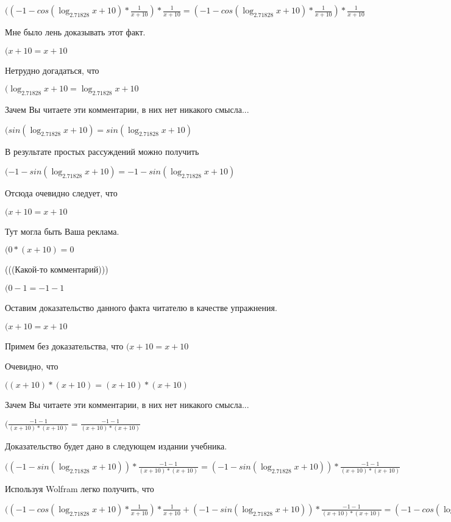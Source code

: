 \documentclass[12pt,a4paper,fleqn]{article}
\theoremstyle{definition}
\begin{document}
$(( -1  - cos(\log_{ 2.71828 }{ x  +  10 }) * \frac{ 1 }{ x  +  10 }
) * \frac{ 1 }{ x  +  10 }
 = ( -1  - cos(\log_{ 2.71828 }{ x  +  10 }) * \frac{ 1 }{ x  +  10 }
) * \frac{ 1 }{ x  +  10 }
$

Мне было лень доказывать этот факт.

$( x  +  10  =  x  +  10 $

Нетрудно догадаться, что

$(\log_{ 2.71828 }{ x  +  10 } = \log_{ 2.71828 }{ x  +  10 }$

Зачем Вы читаете эти комментарии, в них нет никакого смысла...

$(sin(\log_{ 2.71828 }{ x  +  10 }) = sin(\log_{ 2.71828 }{ x  +  10 })$

В результате простых рассуждений можно получить

$( -1  - sin(\log_{ 2.71828 }{ x  +  10 }) =  -1  - sin(\log_{ 2.71828 }{ x  +  10 })$

Отсюда очевидно следует, что

$( x  +  10  =  x  +  10 $

Тут могла быть Ваша реклама.

$( 0  * ( x  +  10 ) =  0 $

(((Какой-то комментарий)))

$( 0  -  1  =  -1  -  1 $

Оставим доказательство данного факта читателю в качестве упражнения.

$( x  +  10  =  x  +  10 $

Примем без доказательства, что
$( x  +  10  =  x  +  10 $

Очевидно, что

$(( x  +  10 ) * ( x  +  10 ) = ( x  +  10 ) * ( x  +  10 )$

Зачем Вы читаете эти комментарии, в них нет никакого смысла...

$(\frac{ -1  -  1 }{( x  +  10 ) * ( x  +  10 )}
 = \frac{ -1  -  1 }{( x  +  10 ) * ( x  +  10 )}
$

Доказательство будет дано в следующем издании учебника.

$(( -1  - sin(\log_{ 2.71828 }{ x  +  10 })) * \frac{ -1  -  1 }{( x  +  10 ) * ( x  +  10 )}
 = ( -1  - sin(\log_{ 2.71828 }{ x  +  10 })) * \frac{ -1  -  1 }{( x  +  10 ) * ( x  +  10 )}
$

Используя Wolfram легко получить, что

$(( -1  - cos(\log_{ 2.71828 }{ x  +  10 }) * \frac{ 1 }{ x  +  10 }
) * \frac{ 1 }{ x  +  10 }
 + ( -1  - sin(\log_{ 2.71828 }{ x  +  10 })) * \frac{ -1  -  1 }{( x  +  10 ) * ( x  +  10 )}
 = ( -1  - cos(\log_{ 2.71828 }{ x  +  10 }) * \frac{ 1 }{ x  +  10 }
) * \frac{ 1 }{ x  +  10 }
 + ( -1  - sin(\log_{ 2.71828 }{ x  +  10 })) * \frac{ -1  -  1 }{( x  +  10 ) * ( x  +  10 )}
$
\end{document}

